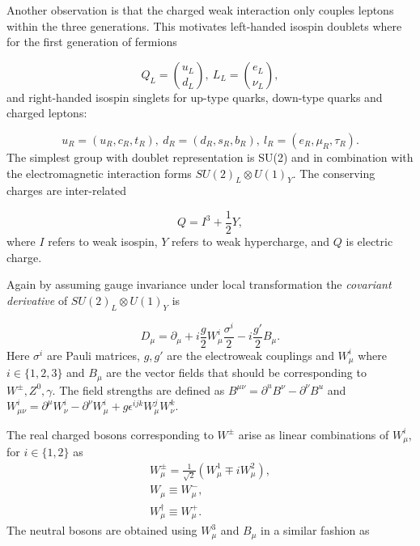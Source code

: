Another observation is that the charged weak interaction only couples leptons within the three generations. This motivates left-handed isospin doublets where for the first generation of fermions

\begin{equation}
Q_{L} = \binom{u_{L}}{d_{L}}, ~L_{L} = \binom{e_{L}}{\nu_{L}},
	\label{eq:defdou}
\end{equation}
and right-handed isospin singlets for up-type quarks, down-type quarks and charged leptons:

\begin{equation}
	u_{R}=(u_{R},c_{R},t_{R}),~
	d_{R}=(d_{R},s_{R},b_{R}),~
	l_{R}=(e_{R},\mu_{R},\tau_{R}).
	\label{eq:defsin}
\end{equation}
The simplest group with doublet representation is SU(2) and in combination with the electromagnetic interaction forms $SU(2)_{L} \otimes U(1)_{Y}$. The conserving charges are inter-related 

\begin{equation}
Q=I^{3} + \frac{1}{2}Y,
\end{equation}
where $I$ refers to weak isospin, $Y$ refers to weak hypercharge, and $Q$ is electric charge.

Again by assuming gauge invariance under local transformation the \textit{covariant derivative} of $SU(2)_{L}\otimes U(1)_{Y}$ is 

\begin{equation}
	D_{\mu} = \partial_{\mu} + i\frac{g}{2}W_{\mu}^{i} \frac{\sigma^{i}}{2} - i \frac{g'}{2}B_{\mu}. 
\label{eq:covdev}
\end{equation}
Here $\sigma^{i}$ are Pauli matrices, $g,g'$ are the electroweak couplings and $W_{\mu}^{i}$ where $i\in\{1,2,3\}$ and $B_{\mu}$ are the vector fields that should be corresponding to $W^{\pm},Z^{0},\gamma$.
The field strengths are defined as $B^{\mu\nu}=\partial^{u}B^{\nu} - \partial^{\nu}B^{u}$ and $W^{i}_{\mu\nu} = \partial^{\mu}W^{i}_{\nu} - \partial^{\nu}W^{i}_{\mu}+ g\epsilon^{ijk}W_{\mu}^{j}W_{\nu}^{k}$.

The real charged bosons corresponding to $W^{\pm}$ arise as linear combinations of $W^{i}_{\mu}$, for $i\in\{1,2\}$ as
\begin{equation}
\begin{split}
W^{\pm}_{\mu} = \frac{1}{\sqrt{2}}(W^{1}_{\mu}\mp iW^{2}_{\mu}),
\\
W_{\mu} \equiv W^{-}_{\mu},
\\
W^{\dagger}_{\mu} \equiv W^{+}_{\mu}. 
\end{split}
\end{equation} 
The neutral bosons are obtained using $W_{\mu}^{3}$ and $B_{\mu}$ in a similar fashion as


